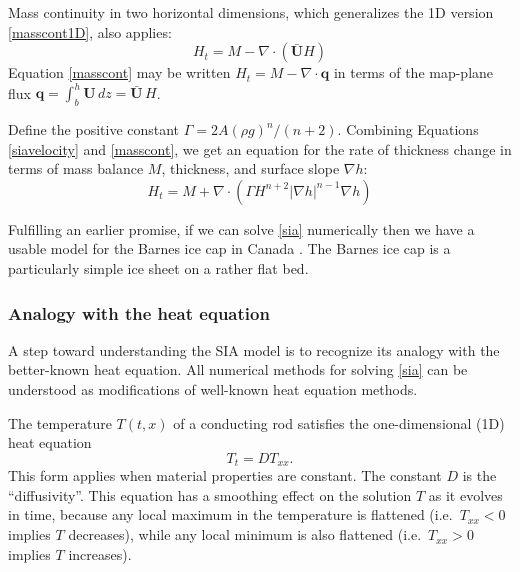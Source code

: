 \documentclass[titlepage,a4paper,final,12pt]{scrartcl}
\newcommand{\bq}{\mathbf{q}}
\newcommand{\grad}{\nabla}
\newcommand{\Div}{\nabla\cdot}
\begin{document}
Mass continuity in two horizontal dimensions, which generalizes the 1D version \eqref{masscont1D}, also applies:
\begin{equation}
    H_t = M - \Div\left(\bar{\mathbf{U}} H\right)  \label{masscont}
\end{equation}
Equation \eqref{masscont} may be written $H_t = M - \Div \bq$ in terms of the map-plane flux $\bq = \int_{b}^{h} \mathbf{U}\,dz = \bar{\mathbf{U}}\,H$.

Define the positive constant $\Gamma = 2 A (\rho g)^n / (n+2)$.  Combining Equations \eqref{siavelocity} and \eqref{masscont}, we get an equation for the rate of thickness change in terms of mass balance $M$, thickness, and surface slope $\grad h$:
\begin{equation}
H_t = M + \Div \left(\Gamma H^{n+2} |\grad h|^{n-1} \grad h \right) \label{sia}
\end{equation}

Fulfilling an earlier promise, if we can solve \eqref{sia} numerically then we have a usable model for the Barnes ice cap in Canada \cite{Mahaffy}.  The Barnes ice cap is a particularly simple ice sheet on a rather flat bed.

\subsubsection*{Analogy with the heat equation}  A step toward understanding the SIA model is to recognize its analogy with the better-known heat equation.  All numerical methods for solving \eqref{sia} can be understood as modifications of well-known heat equation methods.

The temperature $T(t,x)$ of a conducting rod satisfies the one-dimensional (1D) heat equation
\begin{equation}
  T_t = D T_{xx}. \label{heat1D}
\end{equation}
This form applies when material properties are constant.  The constant $D$ is the ``diffusivity''.  This equation has a smoothing effect on the solution $T$ as it evolves in time, because any local maximum in the temperature is flattened (i.e.~$T_{xx}<0$ implies $T$ decreases), while any local minimum is also flattened (i.e.~$T_{xx}>0$ implies $T$ increases).
\end{document}
